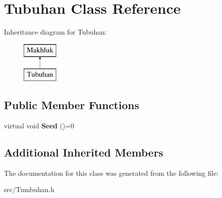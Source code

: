 \hypertarget{class_tubuhan}{}\section{Tubuhan Class Reference}
\label{class_tubuhan}
Inheritance diagram for Tubuhan\+:\begin{figure}[H]
\begin{center}
\leavevmode
\includegraphics[height=2.000000cm]{class_tubuhan}
\end{center}
\end{figure}
\subsection*{Public Member Functions}
\begin{DoxyCompactItemize}
\item 
\hypertarget{class_tubuhan_a499f3dc22b711bb42d60744ec649310d}{}virtual void {\bfseries Seed} ()=0\label{class_tubuhan_a499f3dc22b711bb42d60744ec649310d}

\end{DoxyCompactItemize}
\subsection*{Additional Inherited Members}


The documentation for this class was generated from the following file\+:\begin{DoxyCompactItemize}
\item 
src/Tumbuhan.\+h\end{DoxyCompactItemize}
